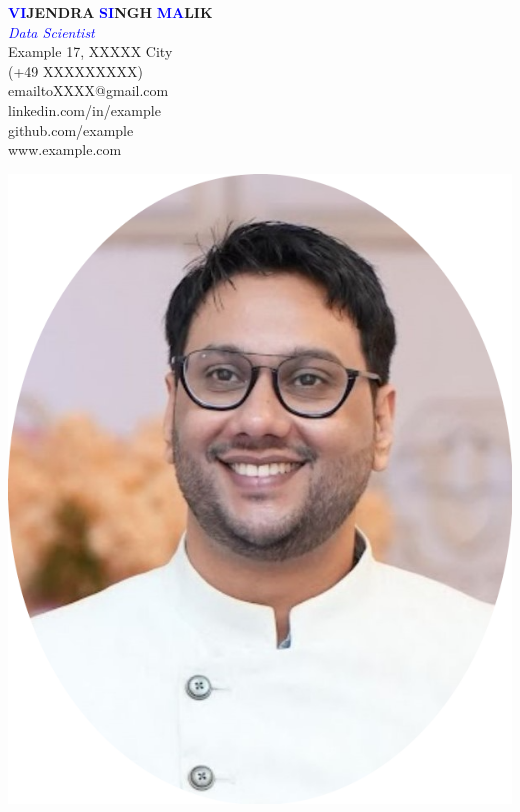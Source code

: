 \documentclass{article}
\begin{document}

\vspace*{-10pt} %
\noindent\filright
\begin{minipage}[t]{0.75\textwidth} %
  \vspace{0pt}
  {\textbf{\textcolor{blue}{VI}}\textbf{\textcolor{darktext}{JENDRA}} \textbf{\textcolor{blue}{SI}}\textbf{\textcolor{darktext}{NGH}} \textbf{\textcolor{blue}{MA}}\textbf{\textcolor{darktext}{LIK}}} \\
  \textcolor{blue}{\emph{Data Scientist }} \\
   Example 17, XXXXX City \\
  \textcolor{darktext}{\faMobile} (+49 XXXXXXXXX) \\
  \textcolor{darktext}{\faEnvelope} emailtoXXXX@gmail.com \\
  \textcolor{blue}{\faLinkedin} linkedin.com/in/example\\
  \textcolor{blue}{\faGithub} github.com/example\\
   \textcolor{blue}{\faInternetExplorer} www.example.com\\
  
\end{minipage}
\hfill %
\begin{minipage}[t]{0.15\textwidth}
  \vspace{0pt}
  \includegraphics[width=\textwidth]{ResumePic-modified.png} %
\end{minipage}
\end{document}

